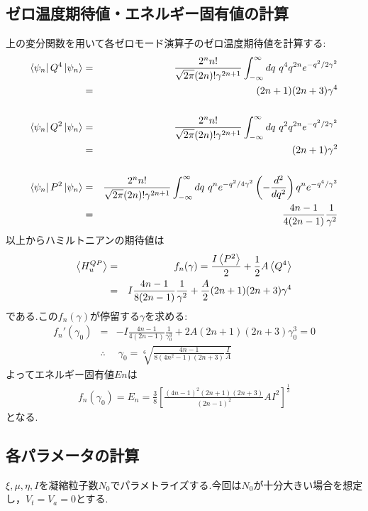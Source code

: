 \documentclass[10.5pt,a4paper]{jreport}
\begin{document}
\subsection{ゼロ温度期待値・エネルギー固有値の計算}
上の変分関数を用いて各ゼロモード演算子のゼロ温度期待値を計算する:
\begin{eqnarray}
  \nonumber  \bra{\psi_n}Q^4\ket{\psi_n} &=& \frac{2^nn!}{\sqrt{2\pi}(2n)!\gamma^{2n+1}}\int^{\infty}_{-\infty}dq\ q^4q^{2n}e^{-q^2/2\gamma^2}\\
  &=& (2n+1)(2n+3)\gamma^4\\
  \nonumber  \\
  \nonumber  \bra{\psi_n}Q^2\ket{\psi_n} &=& \frac{2^nn!}{\sqrt{2\pi}(2n)!\gamma^{2n+1}}\int^{\infty}_{-\infty}dq\ q^2q^{2n}e^{-q^2/2\gamma^2}\\
  &=& (2n+1)\gamma^2\\
  \nonumber \\
  \nonumber  \bra{\psi_n}P^2\ket{\psi_n} &=& \frac{2^nn!}{\sqrt{2\pi}(2n)!\gamma^{2n+1}}\int^{\infty}_{-\infty}dq\ q^{n}e^{-q^2/4\gamma^2}\left(-\frac{d^2}{dq^2}\right)q^ne^{-q^4/\gamma^2}\\
  &=& \frac{4n-1}{4(2n-1)}\frac{1}{\gamma^2}
\end{eqnarray}
以上からハミルトニアンの期待値は
\begin{eqnarray}
  \nonumber  \ev{H^{QP}_u} &=& f_n(\gamma) = \frac{I\ev{P^2}}{2} + \frac{1}{2}A\ev{Q^4}\\
  &=& I\frac{4n-1}{8(2n-1)}\frac{1}{\gamma^2} + \frac{A}{2}(2n+1)(2n+3)\gamma^4
\end{eqnarray}
である.この$f_n(\gamma)$が停留する$\gamma$を求める:
\begin{eqnarray}
  f_n'(\gamma_0) &=& -I\frac{4n-1}{4(2n-1)}\frac{1}{\gamma^3_0} + 2A(2n+1)(2n+3)\gamma^3_0 = 0\\
  &\therefore&\ \gamma_0 = {\sqrt[6]{\frac{4n-1}{8(4n^2-1)(2n+3)}\frac{I}{A}}}
\end{eqnarray}
よってエネルギー固有値$En$は
\begin{eqnarray}
  f_n(\gamma_0) = E_n = \frac{3}{8}\left[\frac{(4n-1)^2(2n+1)(2n+3)}{(2n-1)^2}AI^2\right]^{\frac{1}{3}}
\end{eqnarray}
となる.
\subsection{各パラメータの計算}
$\xi, \mu, \eta, I$を凝縮粒子数$N_0$でパラメトライズする.今回は$N_0$が十分大きい場合を想定し，$V_t = V_a = 0$とする.
\end{document}
